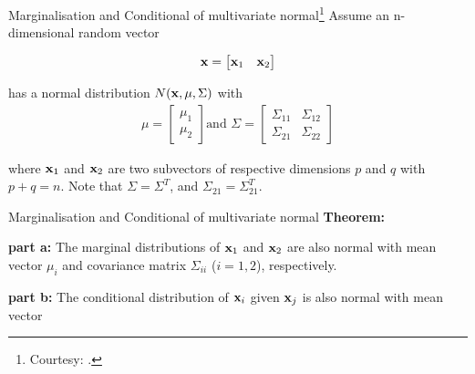 \documentclass{beamer}
\begin{document}
\begin{frame}{Marginalisation and Conditional of multivariate normal\footnote{Courtesy: \nodeSeven.}}
	Assume an n-dimensional random vector
	
	\begin{equation}
	{\bf x}=\begin{bmatrix}{\bf x}_1 & {\bf x}_2\end{bmatrix} 
	\end{equation}
	
	has a normal distribution $N({\bf x},\mu,\Sigma)$ with
	\begin{gather}\mu=
	\begin{bmatrix}
	\mu_1 \\
	\mu_2
	\end{bmatrix} 
	\text{and }
	\Sigma = \begin{bmatrix}
	\Sigma_{11}& \Sigma_{12}\\
	\Sigma_{21}&\Sigma_{22}
	\end{bmatrix} 
	\end{gather}
	
	where ${\bf x}_1$ and ${\bf x}_2$ are two subvectors of respective dimensions $p$ and $q$ with $p+q=n$. Note that $\Sigma=\Sigma^T$, and $\Sigma_{21}=\Sigma_{21}^T$.
\end{frame}

\begin{frame}{Marginalisation and Conditional of multivariate normal}
	\textbf{Theorem:}
	
	\textbf{part a:} The marginal distributions of ${\bf x}_1$ and ${\bf x}_2$ are also normal with mean vector $\mu_i$ and covariance matrix $\Sigma_{ii}$ ($i=1,2$), respectively.
	
	\textbf{part b:} The conditional distribution of ${\bf x}_i$ given ${\bf x}_j$ is also normal with mean vector
	
\end{frame}
\end{document}
